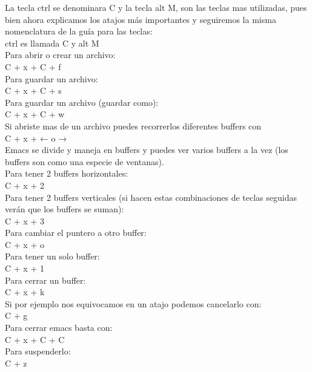 La tecla ctrl se denominara C y la tecla alt M, son las teclas mas utilizadas, pues bien ahora explicamos los atajos más importantes y seguiremos la misma nomenclatura de la guía para las teclas:\\

ctrl es llamada C y alt M\\

Para abrir o crear un archivo:\\
C + x + C + f\\

Para guardar un archivo:\\
C + x + C + s\\

Para guardar un archivo (guardar como):\\
C + x + C + w\\

Si abriste mas de un archivo puedes recorrerlos diferentes buffers con\\
C + x + ← o →\\

Emacs se divide y maneja en buffers y puedes ver varios buffers a la vez (los buffers son como una especie de ventanas).\\

Para tener 2 buffers horizontales:\\
C + x + 2\\

Para tener 2 buffers verticales (si hacen estas combinaciones de teclas seguidas verán que los buffers se suman):\\
C + x + 3\\

Para cambiar el puntero a otro buffer:\\
C + x + o\\

Para tener un solo buffer:\\
C + x + 1\\

Para cerrar un buffer:\\
C + x + k\\

Si por ejemplo nos equivocamos en un atajo podemos cancelarlo con:\\
C + g\\

Para cerrar emacs basta con:\\
C + x + C + C\\

Para suspenderlo:\\
C + z\\

